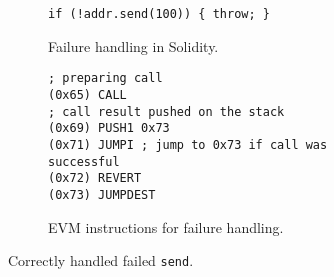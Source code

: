 \begin{figure}
  \centering
  \begin{subfigure}{\columnwidth}
\begin{lstlisting}[language=Solidity,basicstyle=\footnotesize\ttfamily]
if (!addr.send(100)) { throw; }
\end{lstlisting}
    \caption{Failure handling in Solidity.}
    \label{fig:handled-exception-solidity}
  \end{subfigure}
  \begin{subfigure}{\columnwidth}
\begin{lstlisting}[language=esm, basicstyle=\footnotesize\ttfamily]
; preparing call
(0x65) CALL
; call result pushed on the stack
(0x69) PUSH1 0x73
(0x71) JUMPI ; jump to 0x73 if call was successful
(0x72) REVERT
(0x73) JUMPDEST
\end{lstlisting}
    \caption{EVM instructions for failure handling.}
    \label{fig:handled-exception-instructions}
  \end{subfigure}
  \caption{Correctly handled failed \lstinline{send}.}
  \label{fig:handled-exception}
\end{figure}




